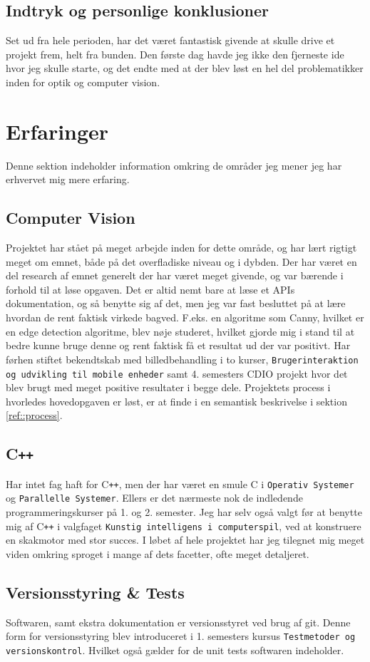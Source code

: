 \subsection{Indtryk og personlige konklusioner}
Set ud fra hele perioden, har det været fantastisk givende at skulle drive et projekt frem, helt fra bunden. Den første dag havde jeg ikke den fjerneste ide hvor jeg skulle starte, og det endte med at der blev løst en hel del problematikker inden for optik og computer vision.

\section{Erfaringer}
Denne sektion indeholder information omkring de områder jeg mener jeg har erhvervet mig mere erfaring.

\subsection{Computer Vision}
Projektet har stået på meget arbejde inden for dette område, og har lært rigtigt meget om emnet, både på det overfladiske niveau og i dybden. Der har været en del research af emnet generelt der har været meget givende, og var bærende i forhold til at løse opgaven. Det er altid nemt bare at læse et APIs dokumentation, og så benytte sig af det, men jeg var fast besluttet på at lære hvordan de rent faktisk virkede bagved. F.eks. en algoritme som Canny, hvilket er en edge detection algoritme, blev nøje studeret, hvilket gjorde mig i stand til at bedre kunne bruge denne og rent faktisk få et resultat ud der var positivt.
Har førhen stiftet bekendtskab med billedbehandling i to kurser, \texttt{Brugerinteraktion og udvikling til mobile enheder} samt 4. semesters CDIO projekt hvor det blev brugt med meget positive resultater i begge dele.
Projektets process i hvorledes hovedopgaven er løst, er at finde i en semantisk beskrivelse i sektion \ref{ref::process}.

\subsection{C\texttt{++}}
Har intet fag haft for C\texttt{++}, men der har været en smule C i \texttt{Operativ Systemer} og \texttt{Parallelle Systemer}. Ellers er det nærmeste nok de indledende programmeringskurser på 1. og 2. semester. Jeg har selv også valgt før at benytte mig af C\texttt{++} i valgfaget \texttt{Kunstig intelligens i computerspil}, ved at konstruere en skakmotor med stor succes.
I løbet af hele projektet har jeg tilegnet mig meget viden omkring sproget i mange af dets facetter, ofte meget detaljeret.

\subsection{Versionsstyring \& Tests}
Softwaren, samt ekstra dokumentation er versionsstyret ved brug af git. Denne form for versionsstyring blev introduceret i 1. semesters kursus \texttt{Testmetoder og versionskontrol}. Hvilket også gælder for de unit tests softwaren indeholder.
